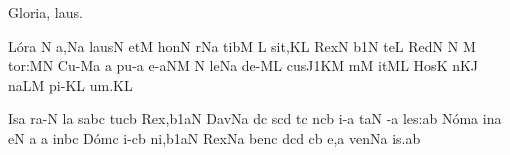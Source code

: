 \beginhymn Gloria, laus.


\Internote
\nosolesmescustos
\initiumgregorianum
%
\sgn L{\'o}r\punctum a\egn
{}\punctum N\egn
\sgn {}a{,}\pes Na\egn
\spatium
\sgn l{au}s\bivirga N\egn
\spatium
\sgn {}et\punctum M\egn
\spatium
\sgn h{o}n\punctum N\egn
{}r\pes Na\egn
\spatium
\sgn t{i}b\punctum M\egn
{}\punctum L\egn
\spatium
\sgn si{t,}\punctum K\augmentum L\egn
\spatium
\divisiominima
\spatium
\sgn Rex\punctum N\egn
\spatium
{}\episem b1\punctum N\egn
\sgn te{}\punctum L\egn
\spatium
\sgn Red\punctum N\egn
{}\bivirga N\egn
\custos M
\lineaproxima
\sgn to{r:}\engl{}\punctum M\augmentum N\egn
\spatium
\divisiomaior
\spatium
\sgn C{u}{-}\pes Ma\egn
{}\punctum a\egn
\spatium
\sgn pu{-}\punctum a\egn
\sgn {}e{-}\climacus aNM\egn
{}\punctum N\egn
\sgn le{}\pes Na\egn
\spatium
\sgn d{e}-\clivis ML\egn
\sgn cu{s}\episem J1\pes KM\egn
\spatium
\divisiominima
\spatium
m\punctum M\egn
{}it\clivis ML\egn
\spatium
\sgn Hos\punctum K\egn
{}n\cephalicus KJ\egn
\sgn na{}\pes LM\egn
\spatium
\sgn p{i}-\punctum K\augmentum L\egn
\sgn {}u{m.}\punctum K\augmentum L\egn
\spatium
\Finisgregoriana


\bigskip

\nosolesmescustos
\initiumgregorianum
%
\sgn {}Is\punctum a\egn
\sgn ra-\punctum N\egn
{}l\punctum a\egn
\spatium
{}s\punctum a\nonspatium\quilismapes bc\egn
\spatium
\sgn tu{}\clivis cb\egn
\spatium
\sgn Re{x,}\episem b1\clivis aN\egn
\spatium
\divisiominima
\spatium
\sgn Dav\pes Na\egn
\sgn {}{\'\i}d\punctum c\egn
{}s\pes cd\egn
\spatium
{}t\punctum c\egn
\spatium
\sgn {}{\'\i}n\cephalicus cb\egn
{}i-\punctum a\egn
\sgn ta{}\punctum N\egn
\spatium
{}-\punctum a\egn
\sgn le{s:}\punctum a\augmentum b\egn
\spatium
\divisiomaior
\spatium
\sgn N{\'o}m\punctum a\egn
\sgn {}in\punctum a\egn
\sgn {}e{}\punctum N\egn
\spatium
\custos a
\lineaproxima
{}\punctum a\egn
\spatium
\sgn {}in\quilismapes bc\egn
\spatium
\sgn D{\'o}m\punctum c\egn
\sgn {}i-\clivis cb\egn
\sgn ni,\episem b1\clivis aN\egn
\spatium
\divisiominima
\spatium
\sgn Rex\pes Na\egn
\spatium
\sgn ben\punctum c\egn
{}d\pes cd\egn
{}\clivis cb\egn
\sgn {}e,\punctum a\egn
\spatium
\sgn v{e}n\pes Na\egn
\sgn {}i{s.}\punctum a\augmentum b\egn
\spatium
\Finisgregoriana

